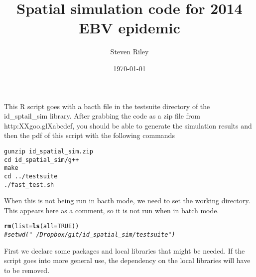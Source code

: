 \documentclass{article}\usepackage[]{graphicx}\usepackage[]{color}
\title{Spatial simulation code for 2014 EBV epidemic}
\author{Steven Riley}
\date{\today}
\makeatletter
\newcommand{\hlnum}[1]{\textcolor[rgb]{0.686,0.059,0.569}{#1}}%
\newcommand{\hlcom}[1]{\textcolor[rgb]{0.678,0.584,0.686}{\textit{#1}}}%
\newcommand{\hlstd}[1]{\textcolor[rgb]{0.345,0.345,0.345}{#1}}%
\newcommand{\hlkwc}[1]{\textcolor[rgb]{0.333,0.667,0.333}{#1}}%
\newcommand{\hlkwd}[1]{\textcolor[rgb]{0.737,0.353,0.396}{\textbf{#1}}}%
\newenvironment{kframe}{%
 \def\at@end@of@kframe{}%
 \ifinner\ifhmode%
  \def\at@end@of@kframe{\end{minipage}}%
  \begin{minipage}{\columnwidth}%
 \fi\fi%
 \def\FrameCommand##1{\hskip\@totalleftmargin \hskip-\fboxsep
 \colorbox{shadecolor}{##1}\hskip-\fboxsep
     \hskip-\linewidth \hskip-\@totalleftmargin \hskip\columnwidth}%
 \MakeFramed {\advance\hsize-\width
   \@totalleftmargin\z@ \linewidth\hsize
   \@setminipage}}%
 {\par\unskip\endMakeFramed%
 \at@end@of@kframe}
\newenvironment{knitrout}{}{} %
\makeatother
\begin{document}



\maketitle



\newpage


This R script goes with a bacth file in the testsuite directory of the
id\_sptail\_sim library. After grabbing the code as a zip file from
http:XXgoo.glXabcdef, you should be able to generate the simulation
results and then the pdf of this script with the following commands

\begin{verbatim}
gunzip id_spatial_sim.zip 
cd id_spatial_sim/g++ 
make 
cd ../testsuite 
./fast_test.sh 
\end{verbatim}


When this is not being run in bacth mode, we need to set the working directory.
This appears here as a comment, so it is not run when in batch mode.

\begin{knitrout}
\color{fgcolor}\begin{kframe}
\begin{alltt}
\hlkwd{rm}\hlstd{(}\hlkwc{list}\hlstd{=}\hlkwd{ls}\hlstd{(}\hlkwc{all}\hlstd{=}\hlnum{TRUE}\hlstd{))}
\hlcom{# setwd("~/Dropbox/git/id_spatial_sim/testsuite")}
\end{alltt}
\end{kframe}
\end{knitrout}

First we declare some packages and local libraries that might be needed. If the
script goes into more general use, the dependency on the local libraries will
have to be removed.
\end{document}
